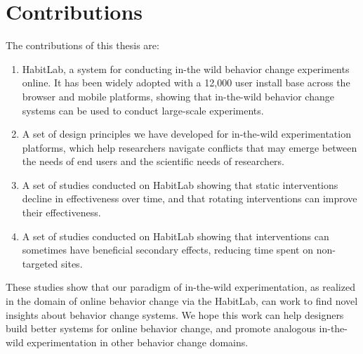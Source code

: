 
\section{Contributions}

The contributions of this thesis are:

\begin{enumerate}
\item HabitLab, a system for conducting in-the wild behavior change experiments online. It has been widely adopted with a 12,000 user install base across the browser and mobile platforms, showing that in-the-wild behavior change systems can be used to conduct large-scale experiments.
\item A set of design principles we have developed for in-the-wild experimentation platforms, which help researchers navigate conflicts that may emerge between the needs of end users and the scientific needs of researchers.
\item A set of studies conducted on HabitLab showing that static interventions decline in effectiveness over time, and that rotating interventions can improve their effectiveness.
\item A set of studies conducted on HabitLab showing that interventions can sometimes have beneficial secondary effects, reducing time spent on non-targeted sites.
\end{enumerate}



These studies show that our paradigm of in-the-wild experimentation, as realized in the domain of online behavior change via the HabitLab, can work to find novel insights about behavior change systems. We hope this work can help designers build better systems for online behavior change, and promote analogous in-the-wild experimentation in other behavior change domains.



